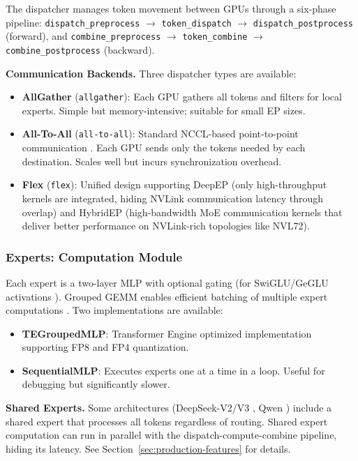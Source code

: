 The dispatcher manages token movement between GPUs through a six-phase pipeline: \texttt{dispatch\_preprocess} $\rightarrow$ \texttt{token\_dispatch} $\rightarrow$ \texttt{dispatch\_postprocess} (forward), and \texttt{combine\_preprocess} $\rightarrow$ \texttt{token\_combine} $\rightarrow$ \texttt{combine\_postprocess} (backward).

\textbf{Communication Backends.} Three dispatcher types are available:
\begin{itemize}
    \item \textbf{AllGather} (\texttt{allgather}): Each GPU gathers all tokens and filters for local experts. Simple but memory-intensive; suitable for small EP sizes.
    \item \textbf{All-To-All} (\texttt{all-to-all}): Standard NCCL-based point-to-point communication \cite{lepikhin2020gshard}. Each GPU sends only the tokens needed by each destination. Scales well but incurs synchronization overhead.
    \item \textbf{Flex} (\texttt{flex}): Unified design supporting DeepEP (only high-throughput kernels are integrated, hiding NVLink communication latency through overlap) \cite{deepep2025} and HybridEP (high-bandwidth MoE communication kernels that deliver better performance on NVLink-rich topologies like NVL72).
\end{itemize}

\subsubsection{Experts: Computation Module}

Each expert is a two-layer MLP with optional gating (for SwiGLU/GeGLU activations \cite{shazeer2020glu}). Grouped GEMM enables efficient batching of multiple expert computations \cite{megablocks,hwang2023tutel}. Two implementations are available:

\begin{itemize}
    \item \textbf{TEGroupedMLP}: Transformer Engine \cite{nvidia_transformer_engine} optimized implementation supporting FP8 and FP4 quantization.
    \item \textbf{SequentialMLP}: Executes experts one at a time in a loop. Useful for debugging but significantly slower.
\end{itemize}

\textbf{Shared Experts.} Some architectures (DeepSeek-V2/V3 \cite{deepseekai2024deepseekv2strongeconomicalefficient,deepseekai2025deepseekv3technicalreport}, Qwen \cite{qwen2025qwen25technicalreport}) include a shared expert that processes all tokens regardless of routing. Shared expert computation can run in parallel with the dispatch-compute-combine pipeline, hiding its latency. See Section~\ref{sec:production-features} for details.


